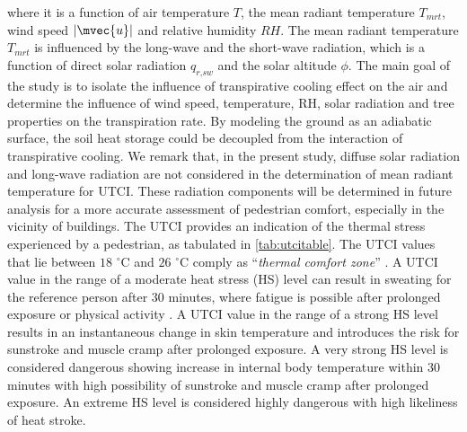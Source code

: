 where it is a function of air temperature $T$, the mean radiant temperature $T_{\textit{mrt}}$, wind speed $|\mvec{u}|$ and relative humidity $RH$. The mean radiant temperature $T_{\textit{mrt}}$ is influenced by the long-wave and the short-wave radiation, which is a function of direct solar radiation $q_{\textit{r,sw}}$ and the solar altitude $\phi$.  The main goal of the study is to isolate the influence of transpirative cooling effect on the air and determine the influence of wind speed, temperature, RH, solar radiation and tree properties on the transpiration rate. By modeling the ground as an adiabatic surface, the soil heat storage could be decoupled from the interaction of transpirative cooling. We remark that, in the present study, diffuse solar radiation and long-wave radiation are not considered in the determination of mean radiant temperature for UTCI. These radiation components will be determined in future analysis for a more accurate assessment of pedestrian comfort, especially in the vicinity of buildings. The UTCI provides an indication of the thermal stress experienced by a pedestrian, as tabulated in \cref{tab:utcitable}. The UTCI values that lie between $18$ $^{\circ}$C and $26$ $^{\circ}$C comply as “\textit{thermal comfort zone}” \citep{Marshall1987}. A UTCI value in the range of a moderate heat stress (HS) level can result in sweating for the reference person after 30 minutes, where fatigue is possible after prolonged exposure or physical activity \citep{Blazejczyk2012,Bazejczyk2013}. A UTCI value in the range of a strong HS level results in an instantaneous change in skin temperature and introduces the risk for sunstroke and muscle cramp after prolonged exposure. A very strong HS level is considered dangerous showing increase in internal body temperature within 30 minutes with high possibility of sunstroke and muscle cramp after prolonged exposure. An extreme HS level is considered highly dangerous with high likeliness of heat stroke.

